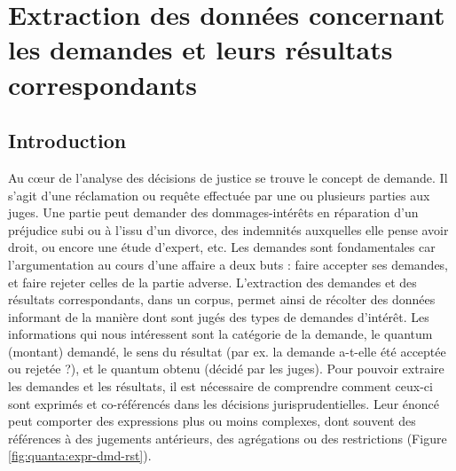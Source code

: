 \chapter{Extraction des données concernant les demandes et leurs résultats correspondants}
\label{chap:quanta}

\section{Introduction}
\label{sec:quanta:introduction}
Au c\oe{}ur de l'analyse des décisions de justice se trouve le concept de demande. Il s'agit d'une réclamation ou requête effectuée par une ou plusieurs parties aux juges. Une partie peut demander des dommages-intérêts en réparation d'un préjudice subi ou à l'issu d'un divorce, des indemnités auxquelles elle pense avoir droit, ou encore une étude d'expert, etc. Les demandes sont fondamentales car l'argumentation au cours d'une affaire a deux buts : faire accepter ses demandes, et faire rejeter celles de la partie adverse. L'extraction des demandes et des résultats correspondants, dans un corpus, permet ainsi de récolter des données informant de la manière dont sont jugés des types de demandes d'intérêt. Les informations qui nous intéressent sont la catégorie de la demande, le quantum (montant) demandé, le sens du résultat (par ex. la demande a-t-elle été acceptée ou rejetée ?), et le quantum obtenu (décidé par les juges). Pour pouvoir extraire les demandes et les résultats, il est nécessaire de comprendre comment ceux-ci sont exprimés et co-référencés dans les décisions jurisprudentielles. Leur énoncé peut comporter des expressions plus ou moins complexes, dont souvent des références à des jugements antérieurs, des agrégations ou des restrictions (Figure \ref{fig:quanta:expr-dmd-rst}).

